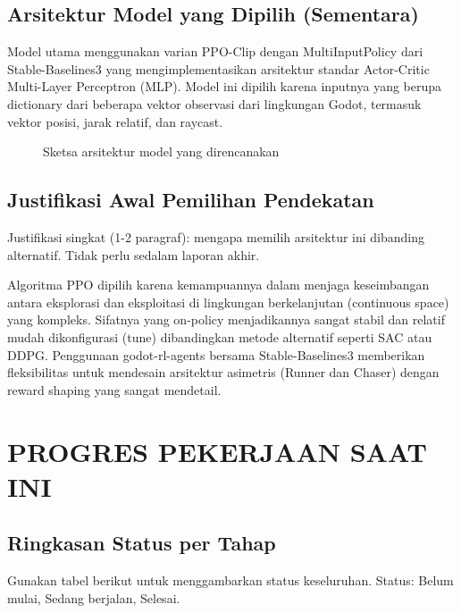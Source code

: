 \documentclass[12pt,a4paper]{article}
\begin{document}
\subsection{Arsitektur Model yang Dipilih (Sementara)}
Model utama menggunakan varian PPO-Clip dengan MultiInputPolicy dari Stable-Baselines3 yang mengimplementasikan arsitektur standar Actor-Critic Multi-Layer Perceptron (MLP). Model ini dipilih karena inputnya yang berupa dictionary dari beberapa vektor observasi dari lingkungan Godot, termasuk vektor posisi, jarak relatif, dan raycast.

\begin{figure}[h]
    \centering
    \caption{Sketsa arsitektur model yang direncanakan}
\end{figure}

\subsection{Justifikasi Awal Pemilihan Pendekatan}
Justifikasi singkat (1-2 paragraf): mengapa memilih arsitektur ini dibanding alternatif. Tidak perlu sedalam laporan akhir.

Algoritma PPO dipilih karena kemampuannya dalam menjaga keseimbangan antara eksplorasi dan eksploitasi di lingkungan berkelanjutan (continuous space) yang kompleks. Sifatnya yang on-policy menjadikannya sangat stabil dan relatif mudah dikonfigurasi (tune) dibandingkan metode alternatif seperti SAC atau DDPG. Penggunaan godot-rl-agents bersama Stable-Baselines3 memberikan fleksibilitas untuk mendesain arsitektur asimetris (Runner dan Chaser) dengan reward shaping yang sangat mendetail.

\newpage

\section{PROGRES PEKERJAAN SAAT INI}

\subsection{Ringkasan Status per Tahap}
Gunakan tabel berikut untuk menggambarkan status keseluruhan. Status: Belum mulai, Sedang berjalan, \checkmark Selesai.
\end{document}
